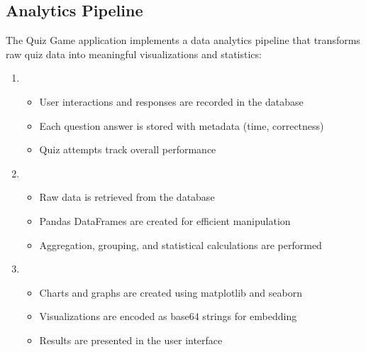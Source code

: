 \documentclass[letterpaper,10pt,english]{sphinxmanual}
\begin{document}
\subsection{Analytics Pipeline}
\label{\detokenize{analytics:analytics-pipeline}}
\sphinxAtStartPar
The Quiz Game application implements a data analytics pipeline that transforms
raw quiz data into meaningful visualizations and statistics:
\begin{enumerate}
%
\item {} 
\sphinxAtStartPar
{}
\begin{itemize}
\item {} 
\sphinxAtStartPar
User interactions and responses are recorded in the database

\item {} 
\sphinxAtStartPar
Each question answer is stored with metadata (time, correctness)

\item {} 
\sphinxAtStartPar
Quiz attempts track overall performance

\end{itemize}

\item {} 
\sphinxAtStartPar
{}
\begin{itemize}
\item {} 
\sphinxAtStartPar
Raw data is retrieved from the database

\item {} 
\sphinxAtStartPar
Pandas DataFrames are created for efficient manipulation

\item {} 
\sphinxAtStartPar
Aggregation, grouping, and statistical calculations are performed

\end{itemize}

\item {} 
\sphinxAtStartPar
{}
\begin{itemize}
\item {} 
\sphinxAtStartPar
Charts and graphs are created using matplotlib and seaborn

\item {} 
\sphinxAtStartPar
Visualizations are encoded as base64 strings for embedding

\item {} 
\sphinxAtStartPar
Results are presented in the user interface


\end{itemize}
\end{enumerate}
\end{document}
